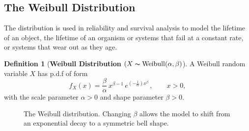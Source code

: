 \documentclass[12pt,a4paper]{report}
\theoremstyle{definition}
\newtheorem{definition}[thm]{Definition}
\theoremstyle{plain}
\theoremstyle{definition}
\begin{document}
\subsection{The Weibull Distribution}
\vspace{-15pt}
The distribution is used in reliability and survival analysis to model the lifetime of an object, the lifetime of an organism or systems that fail at a constant rate, or systems that wear out as they age.

\begin{definition}[\textbf{Weibull Distribution $(X\thicksim \operatorname{Weibull}(\alpha, \beta)$}]
A Weibull random variable $X$ has p.d.f of form \[f_X(x) = \frac{\beta}{\alpha}\, x^{\beta - 1}\, e^{\left(-\frac{1}{\alpha}\right)x^{\beta}}\,, \quad\quad x> 0,\] with the scale parameter $\alpha > 0$ and  shape parameter $\beta > 0$.
\end{definition}


\begin{figure}[H]
\centering
{}
\caption{The Weibull distribution. Changing $\beta$ allows the model to shift from an exponential decay to a symmetric bell shape.}
\end{figure}
\end{document}
